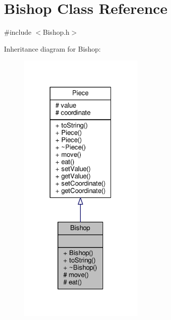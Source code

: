 \hypertarget{class_bishop}{}\section{Bishop Class Reference}
\label{class_bishop}


{\ttfamily \#include $<$Bishop.\+h$>$}



Inheritance diagram for Bishop\+:
\nopagebreak
\begin{figure}[H]
\begin{center}
\leavevmode
\includegraphics[width=172pt]{class_bishop__inherit__graph}
\end{center}
\end{figure}


